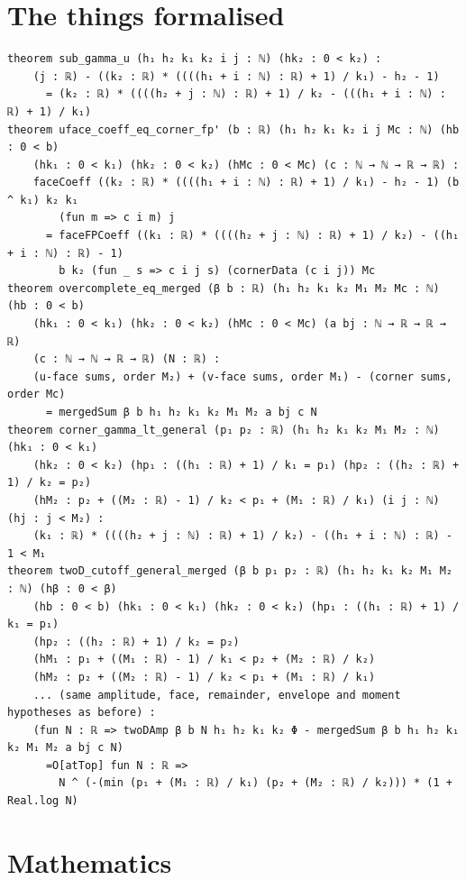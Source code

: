 \documentclass[11pt]{article}
\begin{document}
\section{The things formalised}
{\small
\begin{verbatim}
theorem sub_gamma_u (h₁ h₂ k₁ k₂ i j : ℕ) (hk₂ : 0 < k₂) :
    (j : ℝ) - ((k₂ : ℝ) * ((((h₁ + i : ℕ) : ℝ) + 1) / k₁) - h₂ - 1)
      = (k₂ : ℝ) * ((((h₂ + j : ℕ) : ℝ) + 1) / k₂ - (((h₁ + i : ℕ) : ℝ) + 1) / k₁)
theorem uface_coeff_eq_corner_fp' (b : ℝ) (h₁ h₂ k₁ k₂ i j Mc : ℕ) (hb : 0 < b)
    (hk₁ : 0 < k₁) (hk₂ : 0 < k₂) (hMc : 0 < Mc) (c : ℕ → ℕ → ℝ → ℝ) :
    faceCoeff ((k₂ : ℝ) * ((((h₁ + i : ℕ) : ℝ) + 1) / k₁) - h₂ - 1) (b ^ k₁) k₂ k₁
        (fun m => c i m) j
      = faceFPCoeff ((k₁ : ℝ) * ((((h₂ + j : ℕ) : ℝ) + 1) / k₂) - ((h₁ + i : ℕ) : ℝ) - 1)
        b k₂ (fun _ s => c i j s) (cornerData (c i j)) Mc
theorem overcomplete_eq_merged (β b : ℝ) (h₁ h₂ k₁ k₂ M₁ M₂ Mc : ℕ) (hb : 0 < b)
    (hk₁ : 0 < k₁) (hk₂ : 0 < k₂) (hMc : 0 < Mc) (a bj : ℕ → ℝ → ℝ → ℝ)
    (c : ℕ → ℕ → ℝ → ℝ) (N : ℝ) :
    (u-face sums, order M₂) + (v-face sums, order M₁) - (corner sums, order Mc)
      = mergedSum β b h₁ h₂ k₁ k₂ M₁ M₂ a bj c N
theorem corner_gamma_lt_general (p₁ p₂ : ℝ) (h₁ h₂ k₁ k₂ M₁ M₂ : ℕ) (hk₁ : 0 < k₁)
    (hk₂ : 0 < k₂) (hp₁ : ((h₁ : ℝ) + 1) / k₁ = p₁) (hp₂ : ((h₂ : ℝ) + 1) / k₂ = p₂)
    (hM₂ : p₂ + ((M₂ : ℝ) - 1) / k₂ < p₁ + (M₁ : ℝ) / k₁) (i j : ℕ) (hj : j < M₂) :
    (k₁ : ℝ) * ((((h₂ + j : ℕ) : ℝ) + 1) / k₂) - ((h₁ + i : ℕ) : ℝ) - 1 < M₁
theorem twoD_cutoff_general_merged (β b p₁ p₂ : ℝ) (h₁ h₂ k₁ k₂ M₁ M₂ : ℕ) (hβ : 0 < β)
    (hb : 0 < b) (hk₁ : 0 < k₁) (hk₂ : 0 < k₂) (hp₁ : ((h₁ : ℝ) + 1) / k₁ = p₁)
    (hp₂ : ((h₂ : ℝ) + 1) / k₂ = p₂)
    (hM₁ : p₁ + ((M₁ : ℝ) - 1) / k₁ < p₂ + (M₂ : ℝ) / k₂)
    (hM₂ : p₂ + ((M₂ : ℝ) - 1) / k₂ < p₁ + (M₁ : ℝ) / k₁)
    ... (same amplitude, face, remainder, envelope and moment hypotheses as before) :
    (fun N : ℝ => twoDAmp β b N h₁ h₂ k₁ k₂ Φ - mergedSum β b h₁ h₂ k₁ k₂ M₁ M₂ a bj c N)
      =O[atTop] fun N : ℝ =>
        N ^ (-(min (p₁ + (M₁ : ℝ) / k₁) (p₂ + (M₂ : ℝ) / k₂))) * (1 + Real.log N)
\end{verbatim}
}

\section{Mathematics}
\end{document}
